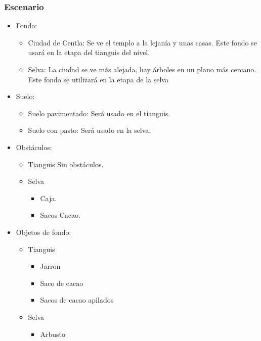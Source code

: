 \documentclass[11pt,letterpaper]{article}
\begin{document}
\subsubsection{Escenario}
\begin{itemize} 
	\item Fondo:
\begin{itemize}
			\item Ciudad de Centla: Se ve el templo a la lejanía y unas casas. Este fondo se usará en la etapa del tianguis del nivel.
			\item Selva: La ciudad se ve más alejada, hay árboles en un plano más cercano. Este fondo se utilizará en la etapa de la selva  
\end{itemize}	
	\item Suelo:
		\begin{itemize}
			\item Suelo pavimentado: Será usado en el tianguis.
			\item Suelo con pasto: Será usado en la selva.
		\end{itemize}
	\item Obstáculos:
		\begin{itemize}
			\item Tianguis
				Sin obstáculos.
			\item Selva
				\begin{itemize}
					\item Caja.
					\item Sacos Cacao.
				\end{itemize}
		\end{itemize}
	\item Objetos de fondo:
		\begin{itemize}
			\item Tianguis
				\begin{itemize}
					\item Jarron
					\item Saco de cacao
					\item Sacos de cacao apilados
				\end{itemize}
			\item Selva
				\begin{itemize}
					\item Arbusto
				\end{itemize}

		\end{itemize}
\end{itemize}	
\end{document}

